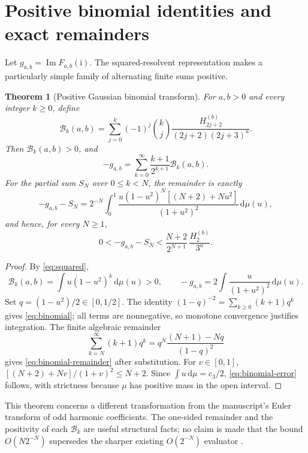 \documentclass[11pt,letterpaper]{article}
\numberwithin{equation}{section}
\newtheorem{theorem}{Theorem}[section]
\theoremstyle{definition}
\theoremstyle{remark}
\DeclareMathOperator{\Imn}{Im}
\newcommand{\dd}{\,\mathrm d}
\newcommand{\ii}{\mathrm i}
\begin{document}
\section{Positive binomial identities and exact remainders}
\label{sec:identities}
Let $g_{a,b}=\Imn F_{a,b}(\ii)$. The squared-resolvent representation
makes a particularly simple family of alternating finite sums positive.

\begin{theorem}[Positive Gaussian binomial transform]\label{thm:binomial}
For $a,b>0$ and every integer $k\ge0$, define
\begin{equation}\label{eq:Bk}
 \mathcal B_k(a,b)=\sum_{j=0}^k(-1)^j\binom kj
   \frac{H_{2j+2}^{(b)}}{(2j+2)(2j+3)^a}.
\end{equation}
Then $\mathcal B_k(a,b)>0$, and
\begin{equation}\label{eq:binomial}
 -g_{a,b}=\sum_{k=0}^\infty\frac{k+1}{2^{k+1}}\mathcal B_k(a,b).
\end{equation}
For the partial sum $S_N$ over $0\le k<N$, the remainder is exactly
\begin{equation}\label{eq:binomial-remainder}
 -g_{a,b}-S_N
 =2^{-N}\int_0^1
 \frac{u(1-u^2)^N[(N+2)+Nu^2]}{(1+u^2)^2}\dd\mu(u),
\end{equation}
and hence, for every $N\ge1$,
\begin{equation}\label{eq:binomial-error}
 0<-g_{a,b}-S_N<\frac{N+2}{2^{N+1}}\,
             \frac{H_2^{(b)}}{3^a}.
\end{equation}
\end{theorem}
\begin{proof}
By \eqref{eq:squared},
\[
 \mathcal B_k(a,b)=\int u(1-u^2)^k\dd\mu(u)>0,
 \qquad -g_{a,b}=2\int\frac{u}{(1+u^2)^2}\dd\mu(u).
\]
Set $q=(1-u^2)/2\in[0,1/2]$. The identity
$(1-q)^{-2}=\sum_{k\ge0}(k+1)q^k$ gives \eqref{eq:binomial}; all
terms are nonnegative, so monotone convergence justifies integration.
The finite algebraic remainder
\[
 \sum_{k=N}^\infty(k+1)q^k
 =q^N\frac{(N+1)-Nq}{(1-q)^2}
\]
gives \eqref{eq:binomial-remainder} after substitution.
For $v\in[0,1]$,
$[(N+2)+Nv]/(1+v)^2\le N+2$. Since $\int u\dd\mu=c_3/2$,
\eqref{eq:binomial-error} follows, with strictness because $\mu$
has positive mass in the open interval.
\end{proof}

This theorem concerns a different transformation from the manuscript's
Euler transform of odd harmonic coefficients. The one-sided remainder
and the positivity of each $\mathcal B_k$ are useful structural facts;
no claim is made that the bound $O(N2^{-N})$ supersedes the sharper
existing $O(2^{-N})$ evaluator \cite{incoming-euler}.
\end{document}
